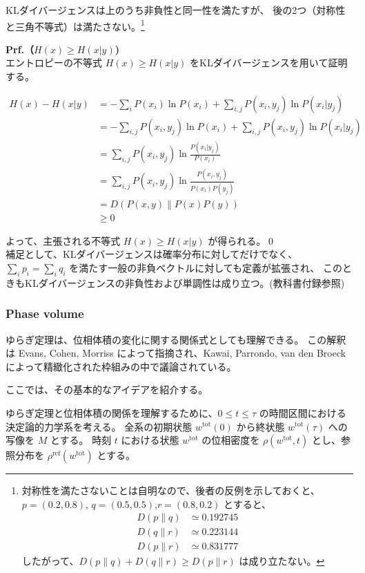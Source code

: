 \documentclass[a4paper,11pt]{jsarticle}
\numberwithin{equation}{section}
\begin{document}
KLダイバージェンスは上のうち非負性と同一性を満たすが、
後の2つ（対称性と三角不等式）は満たさない。\footnote{
    対称性を満たさないことは自明なので、後者の反例を示しておくと、
    $p = (0.2, 0.8)$, $q = (0.5, 0.5)$,$ r = (0.8, 0.2)$ とすると、
    \begin{align}
    D(p \| q) &\simeq 0.192745 \\
    D(q \| r) &\simeq 0.223144 \\
    D(p \| r) &\simeq 0.831777
    \end{align}
    したがって、$D(p \| q) + D(q \| r) \geq D(p \| r)$ は成り立たない。
}

\textbf{Prf.（\( H(x) \geq H(x|y) \))}\\
エントロピーの不等式 \( H(x) \geq H(x|y) \) をKLダイバージェンスを用いて証明する。

\begin{align}
H(x) - H(x|y)
&= - \sum_i P(x_i) \ln P(x_i) + \sum_{i,j} P(x_i, y_j) \ln P(x_i|y_j) \\
&= - \sum_{i,j} P(x_i, y_j) \ln P(x_i) + \sum_{i,j} P(x_i, y_j) \ln P(x_i|y_j) \\
&= \sum_{i,j} P(x_i, y_j) \ln \frac{P(x_i|y_j)}{P(x_i)} \\
&= \sum_{i,j} P(x_i, y_j) \ln \frac{P(x_i, y_j)}{P(x_i) P(y_j)} \\
&= D(P(x, y) \| P(x) P(y)) \\
&\geq 0
\end{align}

よって、主張される不等式 \( H(x) \geq H(x|y) \) が得られる。\qed\\

補足として、KLダイバージェンスは確率分布に対してだけでなく、
$\sum_i p_i = \sum_i q_i$ を満たす一般の非負ベクトルに対しても定義が拡張され、
このときもKLダイバージェンスの非負性および単調性は成り立つ。(教科書付録参照)

\subsubsection{Phase volume}

ゆらぎ定理は、位相体積の変化に関する関係式としても理解できる。
この解釈は Evans, Cohen, Morriss によって指摘され、Kawai, Parrondo, van den Broeck によって精緻化された枠組みの中で議論されている。

ここでは、その基本的なアイデアを紹介する。

ゆらぎ定理と位相体積の関係を理解するために、$0 \leq t \leq \tau$ の時間区間における決定論的力学系を考える。
全系の初期状態 $w^{\mathrm{tot}}(0)$ から終状態 $w^{\mathrm{tot}}(\tau)$ への写像を $M$ とする。
時刻 $t$ における状態 $w^{\mathrm{tot}}$ の位相密度を $\rho(w^{\mathrm{tot}}, t)$ とし、参照分布を $\rho^{\mathrm{ref}}(w^{\mathrm{tot}})$ とする。
\end{document}
